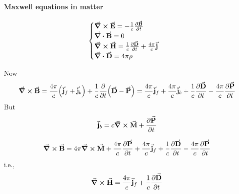 \paragraph{Maxwell equations in matter}
$$\begin{cases}
\curl{\va{E}} = - \frac{1}{c} \pdv{\va{B}}{t}\\
\div{\va{B}}=0\\
\curl{\va{H}} =  \frac{1}{c} \pdv{\va{D}}{t} + \frac{4\pi}{c} \va{j}\\
\div{\va{D}} = 4\pi \rho
\end{cases}$$

Now
\begin{align*}
\curl{\va{B}} = \frac{4\pi}{c} \qty(\va{j}_f+\va{j}_b) +\frac{1}{c} \pdv{t} \qty(\va{D}-\va{P}) =\frac{4\pi}{c} \va{j}_f+\frac{4\pi}{c} \va{j}_b +\frac{1}{c} \pdv{\va{D}}{t} -\frac{4\pi}{c}\pdv{\va{P}}{t} 
\end{align*}
But
$$\va{j}_b = c \curl{\va{M}} + \pdv{\va{P}}{t} $$

\begin{align*}
\curl{\va{B}} =4\pi\curl{\va{M}} + \frac{4\pi}{c}\pdv{\va{P}}{t} +\frac{4\pi}{c} \va{j}_f +\frac{1}{c} \pdv{\va{D}}{t} -\frac{4\pi}{c}\pdv{\va{P}}{t} 
\end{align*}
i.e.,
$$\curl{\va{H}} = \frac{4\pi}{c}\va{j}_f + \frac{1}{c} \pdv{\va{D}}{t}$$